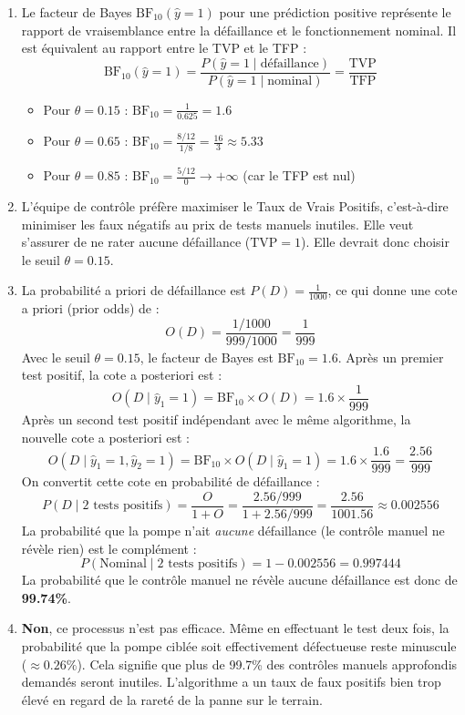 \documentclass[solutions]{../exercices}
\begin{document}
\begin{solution}
\begin{enumerate}
		\item Le facteur de Bayes $\text{BF}_{10}(\hat{y} = 1)$ pour une prédiction positive représente le rapport de vraisemblance entre la défaillance et le fonctionnement nominal. Il est équivalent au rapport entre le TVP et le TFP :
		\[
		\text{BF}_{10}(\hat{y} = 1) = \frac{P(\hat{y} = 1 \mid \text{défaillance})}{P(\hat{y} = 1 \mid \text{nominal})} = \frac{\text{TVP}}{\text{TFP}}
		\]
		\begin{itemize}
			\item Pour $\theta = 0.15$ : $\text{BF}_{10} = \frac{1}{0.625} = 1.6$
			\item Pour $\theta = 0.65$ : $\text{BF}_{10} = \frac{8/12}{1/8} = \frac{16}{3} \approx 5.33$
			\item Pour $\theta = 0.85$ : $\text{BF}_{10} = \frac{5/12}{0} \to +\infty$ (car le TFP est nul)
		\end{itemize}

		\item L'équipe de contrôle préfère maximiser le Taux de Vrais Positifs, c'est-à-dire minimiser les faux négatifs au prix de tests manuels inutiles. Elle veut s'assurer de ne rater aucune défaillance ($\text{TVP} = 1$). Elle devrait donc choisir le seuil \textbf{$\theta = 0.15$}.

		\item La probabilité a priori de défaillance est $P(D) = \frac{1}{1000}$, ce qui donne une cote a priori (prior odds) de :
		\[
		O(D) = \frac{1/1000}{999/1000} = \frac{1}{999}
		\]
		Avec le seuil $\theta = 0.15$, le facteur de Bayes est $\text{BF}_{10} = 1.6$.
		Après un premier test positif, la cote a posteriori est :
		\[
		O(D \mid \hat{y}_1=1) = \text{BF}_{10} \times O(D) = 1.6 \times \frac{1}{999}
		\]
		Après un second test positif indépendant avec le même algorithme, la nouvelle cote a posteriori est :
		\[
		O(D \mid \hat{y}_1=1, \hat{y}_2=1) = \text{BF}_{10} \times O(D \mid \hat{y}_1=1) = 1.6 \times \frac{1.6}{999} = \frac{2.56}{999}
		\]
		On convertit cette cote en probabilité de défaillance :
		\[
		P(D \mid 2\text{ tests positifs}) = \frac{O}{1 + O} = \frac{2.56/999}{1 + 2.56/999} = \frac{2.56}{1001.56} \approx 0.002556
		\]
		La probabilité que la pompe n'ait \textit{aucune} défaillance (le contrôle manuel ne révèle rien) est le complément :
		\[
		P(\text{Nominal} \mid 2\text{ tests positifs}) = 1 - 0.002556 = 0.997444
		\]
		La probabilité que le contrôle manuel ne révèle aucune défaillance est donc de \textbf{99.74\%}.

		\item \textbf{Non}, ce processus n'est pas efficace. Même en effectuant le test deux fois, la probabilité que la pompe ciblée soit effectivement défectueuse reste minuscule ($\approx 0.26\%$). Cela signifie que plus de 99.7\% des contrôles manuels approfondis demandés seront inutiles. L'algorithme a un taux de faux positifs bien trop élevé en regard de la rareté de la panne sur le terrain.
	\end{enumerate}
\end{solution}
\end{document}
